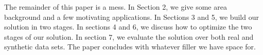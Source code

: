 
The remainder of this paper is a mess. In Section 2, we give some area background and a few motivating applications. In Sections 3 and 5, we build our solution in two stages. In sections 4 and 6, we discuss how to optimize the two stages of our solution. In section 7, we evaluate the solution over both real and synthetic data sets. The paper concludes with whatever filler we have space for.






%

